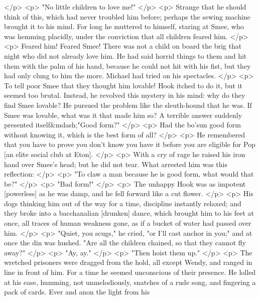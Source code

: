    </p>
    <p>
      "No little children to love me!"
    </p>
    <p>
      Strange that he should think of this, which had never troubled him before;
      perhaps the sewing machine brought it to his mind. For long he muttered to
      himself, staring at Smee, who was hemming placidly, under the conviction
      that all children feared him.
    </p>
    <p>
      Feared him! Feared Smee! There was not a child on board the brig that
      night who did not already love him. He had said horrid things to them and
      hit them with the palm of his hand, because he could not hit with his
      fist, but they had only clung to him the more. Michael had tried on his
      spectacles.
    </p>
    <p>
      To tell poor Smee that they thought him lovable! Hook itched to do it, but
      it seemed too brutal. Instead, he revolved this mystery in his mind: why
      do they find Smee lovable? He pursued the problem like the sleuth-hound
      that he was. If Smee was lovable, what was it that made him so? A terrible
      answer suddenly presented itself&mdash;"Good form?"
    </p>
    <p>
      Had the bo'sun good form without knowing it, which is the best form of
      all?
    </p>
    <p>
      He remembered that you have to prove you don't know you have it before you
      are eligible for Pop [an elite social club at Eton].
    </p>
    <p>
      With a cry of rage he raised his iron hand over Smee's head; but he did
      not tear. What arrested him was this reflection:
    </p>
    <p>
      "To claw a man because he is good form, what would that be?"
    </p>
    <p>
      "Bad form!"
    </p>
    <p>
      The unhappy Hook was as impotent [powerless] as he was damp, and he fell
      forward like a cut flower.
    </p>
    <p>
      His dogs thinking him out of the way for a time, discipline instantly
      relaxed; and they broke into a bacchanalian [drunken] dance, which brought
      him to his feet at once, all traces of human weakness gone, as if a bucket
      of water had passed over him.
    </p>
    <p>
      "Quiet, you scugs," he cried, "or I'll cast anchor in you;" and at once
      the din was hushed. "Are all the children chained, so that they cannot fly
      away?"
    </p>
    <p>
      "Ay, ay."
    </p>
    <p>
      "Then hoist them up."
    </p>
    <p>
      The wretched prisoners were dragged from the hold, all except Wendy, and
      ranged in line in front of him. For a time he seemed unconscious of their
      presence. He lolled at his ease, humming, not unmelodiously, snatches of a
      rude song, and fingering a pack of cards. Ever and anon the light from his
